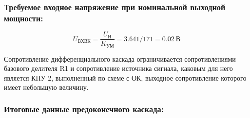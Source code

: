 \subsubsection{Требуемое входное напряжение при номинальной выходной мощности:} %


\begin{equation}
\label{eq:equation4_23}
U_{\text{ВХВК}}=\dfrac{U_{\text{Н}}}{K_{\text{УМ}}}=3.641/171=0.02 ~\text{В}
\end{equation}

Сопротивление дифференциального каскада ограничивается сопротивлениями базового делителя R1 и сопротивление источника сигнала, каковым для него является КПУ 2, выполненный по схеме с ОК, выходное сопротивление которого имеет небольшую величину.
\subsubsection{	Итоговые данные предоконечного каскада:	}
